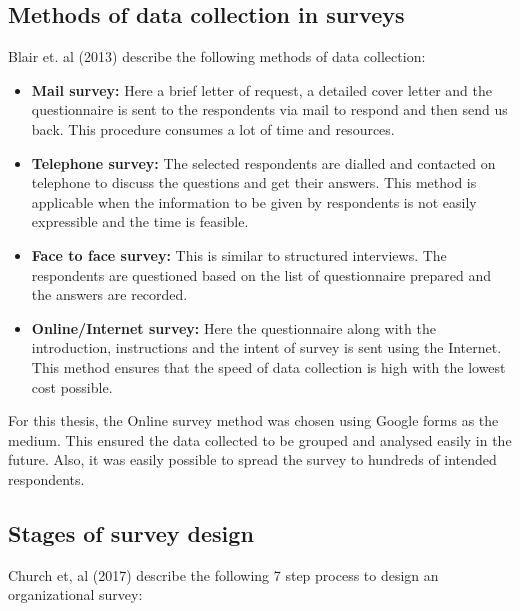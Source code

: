 \subsection{Methods of data collection in surveys}
Blair et. al (2013) describe the following methods of data collection:
\\

\begin{itemize}
    \item \textbf{Mail survey:} Here a brief letter of request, a detailed cover letter and the questionnaire is sent to the respondents via mail to respond and then send us back. This procedure consumes a lot of time and resources.\\
    
    \item \textbf{Telephone survey:} The selected respondents are dialled and contacted on telephone to discuss the questions and get their answers. This method is applicable when the information to be given by respondents is not easily expressible and the time is feasible.\\

    \item \textbf{Face to face survey:} This is similar to structured interviews. The respondents are questioned based on the list of questionnaire prepared and the answers are recorded.\\

    \item \textbf{Online/Internet survey:} Here the questionnaire along with the introduction, instructions and the intent of survey is sent using the Internet. This method ensures that the speed of data collection is high with the lowest cost possible.\\

\end{itemize}
For this thesis, the Online survey method was chosen using Google forms as the medium. This ensured the data collected to be grouped and analysed easily in the future. Also, it was easily possible to spread the survey to hundreds of intended respondents.\\


\subsection{Stages of survey design}
Church et, al (2017) describe the following 7 step process to design an organizational survey:\\

